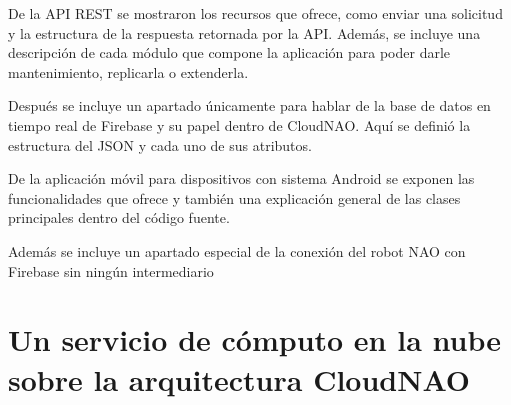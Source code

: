 \documentclass[letterpaper,12pt,spanish]{report}
\begin{document}
De la API REST se mostraron los recursos que ofrece, como enviar una solicitud y la estructura de la respuesta 
retornada por la API. Además, se incluye una descripción
de cada módulo que compone la aplicación para poder
darle mantenimiento, replicarla o extenderla.

Después se incluye un apartado únicamente para
hablar de la base de datos en tiempo real de Firebase
y su papel dentro de CloudNAO. Aquí se definió 
la estructura del JSON y cada uno de sus atributos.

De la aplicación móvil para dispositivos con
sistema Android se exponen las funcionalidades que 
ofrece y también una explicación general de las 
clases principales dentro del código fuente.

Además se incluye un apartado especial de la conexión 
del robot NAO con Firebase sin ningún intermediario









\chapter{Un servicio de cómputo en la nube sobre la arquitectura CloudNAO}
\label{\detokenize{chapter_three:un-servicio-de-computo-en-la-nube-sobre-la-arquitectura-cloudnao}}
\label{\detokenize{chapter_three::doc}}


% 
% 
% 









% 

\nocite{*}



\end{document}
